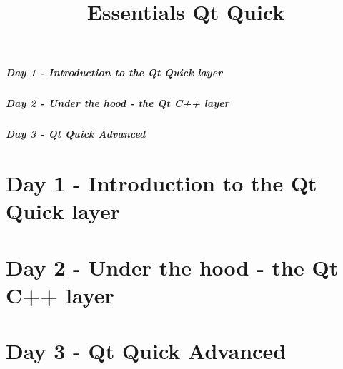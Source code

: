 \documentclass[t]{beamer}
\title{Essentials Qt Quick}
\begin{document}


\begin{frame}
  \frametitle{Day 1 - Introduction to the Qt Quick layer}
  \tableofcontents[part=1]
\end{frame}

\begin{frame}
  \frametitle{Day 2 - Under the hood - the Qt C++ layer}
  \tableofcontents[part=2]
\end{frame}

\begin{frame}
  \frametitle{Day 3 - Qt Quick Advanced}
  \tableofcontents[part=3]
\end{frame}

\part{Day 1 - Introduction to the Qt Quick layer}






\part{Day 2 - Under the hood - the Qt C++ layer}





\part{Day 3 - Qt Quick Advanced}




%


\end{document}
